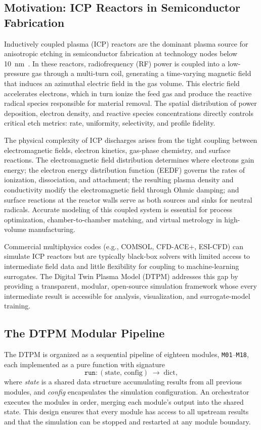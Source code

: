 \documentclass[11pt,a4paper]{report}
\begin{document}
\subsection{Motivation: ICP Reactors in Semiconductor Fabrication}

Inductively coupled plasma (ICP) reactors are the dominant plasma source for anisotropic etching in semiconductor fabrication at technology nodes below \SI{10}{\nano\meter}~\cite{Lieberman2005}.  In these reactors, radiofrequency (RF) power is coupled into a low-pressure gas through a multi-turn coil, generating a time-varying magnetic field that induces an azimuthal electric field in the gas volume.  This electric field accelerates electrons, which in turn ionize the feed gas and produce the reactive radical species responsible for material removal.  The spatial distribution of power deposition, electron density, and reactive species concentrations directly controls critical etch metrics: rate, uniformity, selectivity, and profile fidelity.

The physical complexity of ICP discharges arises from the tight coupling between electromagnetic fields, electron kinetics, gas-phase chemistry, and surface reactions.  The electromagnetic field distribution determines where electrons gain energy; the electron energy distribution function (EEDF) governs the rates of ionization, dissociation, and attachment; the resulting plasma density and conductivity modify the electromagnetic field through Ohmic damping; and surface reactions at the reactor walls serve as both sources and sinks for neutral radicals.  Accurate modeling of this coupled system is essential for process optimization, chamber-to-chamber matching, and virtual metrology in high-volume manufacturing.

Commercial multiphysics codes (e.g., COMSOL, CFD-ACE+, ESI-CFD) can simulate ICP reactors but are typically black-box solvers with limited access to intermediate field data and little flexibility for coupling to machine-learning surrogates.  The Digital Twin Plasma Model (DTPM) addresses this gap by providing a transparent, modular, open-source simulation framework whose every intermediate result is accessible for analysis, visualization, and surrogate-model training.

\subsection{The DTPM Modular Pipeline}

The DTPM is organized as a sequential pipeline of eighteen modules, \texttt{M01}--\texttt{M18}, each implemented as a pure function with signature
\begin{equation}
  \texttt{run}: (\text{state},\, \text{config}) \;\longrightarrow\; \text{dict},
  \label{eq:pipeline-signature}
\end{equation}
where \emph{state} is a shared data structure accumulating results from all previous modules, and \emph{config} encapsulates the simulation configuration.  An orchestrator executes the modules in order, merging each module's output into the shared state.  This design ensures that every module has access to all upstream results and that the simulation can be stopped and restarted at any module boundary.
\end{document}
